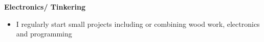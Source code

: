 \documentclass[
	a4paper,
]{fortysecondscv}
\begin{document}
\textbf{Electronics/ Tinkering}
\begin{itemize}[topsep=3pt,itemsep=1pt,leftmargin=*,parsep=1pt]%
    \item I regularly start small projects including or combining wood work, electronics and programming%
\end{itemize}



\cvsignature
\end{document}

